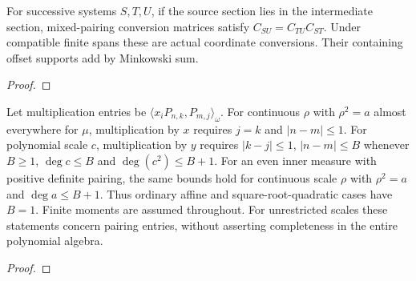 \begin{theorem}
\label{thm:koornwinder-composition}
\leanok
For successive systems $S,T,U$, if the source section lies in the
intermediate section, mixed-pairing conversion matrices satisfy
$C_{SU}=C_{TU}C_{ST}$. Under compatible finite spans these are actual
coordinate conversions. Their containing offset supports add by Minkowski sum.

\end{theorem}
\begin{proof}
\leanok
\end{proof}


\begin{supporting}
\begin{theorem}
\label{thm:koornwinder-multiplication-support}
\leanok
Let multiplication entries be $\langle x_iP_{n,k},P_{m,j}\rangle_\omega$.
For continuous $\rho$ with $\rho^2=a$ almost everywhere for $\mu$,
multiplication by $x$ requires $j=k$ and $|n-m|\le1$.
For polynomial scale $c$, multiplication by $y$ requires
$|k-j|\le1$, $|n-m|\le B$ whenever $B\ge1$, $\deg c\le B$ and
$\deg(c^2)\le B+1$. For an even inner measure with positive definite pairing,
the same bounds hold for continuous scale $\rho$ with $\rho^2=a$ and
$\deg a\le B+1$. Thus ordinary affine and square-root-quadratic cases have
$B=1$. Finite moments are assumed throughout.
For unrestricted scales these statements concern pairing entries, without
asserting completeness in the entire polynomial algebra.
\end{theorem}
\begin{proof}
\leanok
\end{proof}
\end{supporting}


